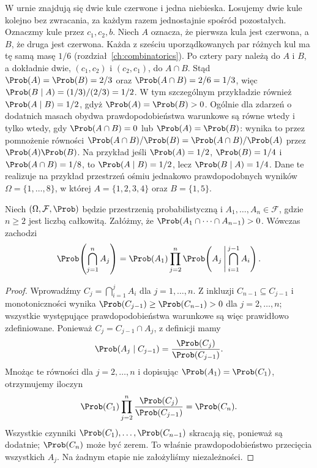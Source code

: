 \begin{przyklad}
W urnie znajdują się dwie kule czerwone i jedna niebieska.
Losujemy dwie kule kolejno bez zwracania, za każdym razem
jednostajnie spośród pozostałych. Oznaczmy kule przez $c_1,c_2,b$.
Niech $A$ oznacza, że pierwsza kula jest czerwona, a $B$, że druga
jest czerwona. Każda z sześciu uporządkowanych par różnych kul
ma tę samą masę $1/6$ (rozdział~\ref{ch:combinatorics}).
Po cztery pary należą do $A$ i $B$, a dokładnie dwie,
$(c_1,c_2)$ i $(c_2,c_1)$, do $A\cap B$. Stąd
$\Prob(A)=\Prob(B)=2/3$ oraz $\Prob(A\cap B)=2/6=1/3$, więc
$\Prob(B\mid A)=(1/3)/(2/3)=1/2$.
W tym szczególnym przykładzie również $\Prob(A\mid B)=1/2$,
gdyż $\Prob(A)=\Prob(B)>0$. Ogólnie dla zdarzeń o dodatnich
masach obydwa prawdopodobieństwa warunkowe są równe wtedy
i tylko wtedy, gdy $\Prob(A\cap B)=0$ lub $\Prob(A)=\Prob(B)$:
wynika to przez pomnożenie równości
$\Prob(A\cap B)/\Prob(B)=\Prob(A\cap B)/\Prob(A)$
przez $\Prob(A)\Prob(B)$. Na przykład jeśli
$\Prob(A)=1/2$, $\Prob(B)=1/4$ i
$\Prob(A\cap B)=1/8$, to
$\Prob(A\mid B)=1/2$, lecz $\Prob(B\mid A)=1/4$.
Dane te realizuje na przykład przestrzeń ośmiu
jednakowo prawdopodobnych wyników $\Omega=\{1,\ldots,8\}$,
w której $A=\{1,2,3,4\}$ oraz $B=\{1,5\}$.
\end{przyklad}

\begin{twierdzenie}
Niech $(\Omega,\mathcal F,\Prob)$ będzie przestrzenią probabilistyczną
i $A_1,\ldots,A_n\in\mathcal F$, gdzie $n\geq2$ jest liczbą całkowitą.
Załóżmy, że $\Prob(A_1\cap\cdots\cap A_{n-1})>0$.
Wówczas zachodzi
\[
\Prob\!\left(\bigcap_{j=1}^n A_j\right)
=\Prob(A_1)\prod_{j=2}^n
\Prob\!\left(A_j\,\middle|\,\bigcap_{i=1}^{j-1}A_i\right).
\]
\end{twierdzenie}
\begin{proof}
Wprowadźmy $C_j=\bigcap_{i=1}^j A_i$ dla
$j=1,\ldots,n$. Z inkluzji $C_{n-1}\subseteq C_{j-1}$ i monotoniczności
wynika $\Prob(C_{j-1})\geq\Prob(C_{n-1})>0$ dla $j=2,\ldots,n$;
wszystkie występujące prawdopodobieństwa warunkowe
są więc prawidłowo zdefiniowane. Ponieważ
$C_j=C_{j-1}\cap A_j$, z definicji mamy
\[
\Prob(A_j\mid C_{j-1})
=\frac{\Prob(C_j)}{\Prob(C_{j-1})}.
\]
Mnożąc te równości dla $j=2,\ldots,n$ i dopisując
$\Prob(A_1)=\Prob(C_1)$, otrzymujemy iloczyn
\[
\Prob(C_1)\prod_{j=2}^n\frac{\Prob(C_j)}{\Prob(C_{j-1})}
=\Prob(C_n).
\]
Wszystkie czynniki $\Prob(C_1),\ldots,\Prob(C_{n-1})$
skracają się, ponieważ są dodatnie; $\Prob(C_n)$ może być zerem.
To właśnie prawdopodobieństwo przecięcia wszystkich $A_j$.
Na żadnym etapie nie założyliśmy niezależności.
\end{proof}

